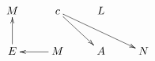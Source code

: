 \documentclass{article}
\begin{document}
\[
  \xymatrix@C=2pc@R=2pc{
    M & c\ar[dr]\ar[drr] & L\\E\ar[u] & M\ar[l] & A & N
  }
\]
\end{document}
